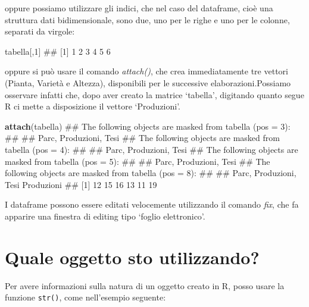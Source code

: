 \documentclass[a4paper,12pt,oneside]{book}
\newenvironment{Shaded}{\begin{snugshade}}{\end{snugshade}}
\newcommand{\KeywordTok}[1]{\textcolor[rgb]{0.13,0.29,0.53}{\textbf{#1}}}
\newcommand{\DecValTok}[1]{\textcolor[rgb]{0.00,0.00,0.81}{#1}}
\newcommand{\NormalTok}[1]{#1}
\theoremstyle{definition}
\theoremstyle{definition}
\theoremstyle{definition}
\theoremstyle{remark}
\begin{document}
oppure possiamo utilizzare gli indici, che nel caso del dataframe, cioè
una struttura dati bidimensionale, sono due, uno per le righe e uno per
le colonne, separati da virgole:

\begin{Shaded}
\begin{Highlighting}[]
\NormalTok{tabella[,}\DecValTok{1}\NormalTok{]}
\NormalTok{## [1] 1 2 3 4 5 6}
\end{Highlighting}
\end{Shaded}

oppure si può usare il comando \emph{attach()}, che crea immediatamente
tre vettori (Pianta, Varietà e Altezza), disponibili per le successive
elaborazioni.Possiamo osservare infatti che, dopo aver creato la matrice
`tabella', digitando quanto segue R ci mette a disposizione il vettore
`Produzioni'.

\begin{Shaded}
\begin{Highlighting}[]
\KeywordTok{attach}\NormalTok{(tabella)}
\NormalTok{## The following objects are masked from tabella (pos = 3):}
\NormalTok{## }
\NormalTok{##     Parc, Produzioni, Tesi}
\NormalTok{## The following objects are masked from tabella (pos = 4):}
\NormalTok{## }
\NormalTok{##     Parc, Produzioni, Tesi}
\NormalTok{## The following objects are masked from tabella (pos = 5):}
\NormalTok{## }
\NormalTok{##     Parc, Produzioni, Tesi}
\NormalTok{## The following objects are masked from tabella (pos = 8):}
\NormalTok{## }
\NormalTok{##     Parc, Produzioni, Tesi}
\NormalTok{Produzioni}
\NormalTok{## [1] 12 15 16 13 11 19}
\end{Highlighting}
\end{Shaded}

I dataframe possono essere editati velocemente utilizzando il comando
\emph{fix}, che fa apparire una finestra di editing tipo `foglio
elettronico'.

\section*{Quale oggetto sto
utilizzando?}\label{quale-oggetto-sto-utilizzando}

Per avere informazioni sulla natura di un oggetto creato in R, posso
usare la funzione \texttt{str()}, come nell'esempio seguente:

\begin{Shaded}
\end{Shaded}
\end{document}
